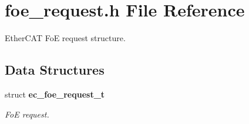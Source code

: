 \section{foe\-\_\-request.\-h \-File \-Reference}
\label{foe__request_8h}


\-Ether\-C\-A\-T \-Fo\-E request structure.  


\subsection*{\-Data \-Structures}
\begin{DoxyCompactItemize}
\item 
struct {\bf ec\-\_\-foe\-\_\-request\-\_\-t}
\begin{DoxyCompactList}\small\item\em \-Fo\-E request. \end{DoxyCompactList}\end{DoxyCompactItemize}
